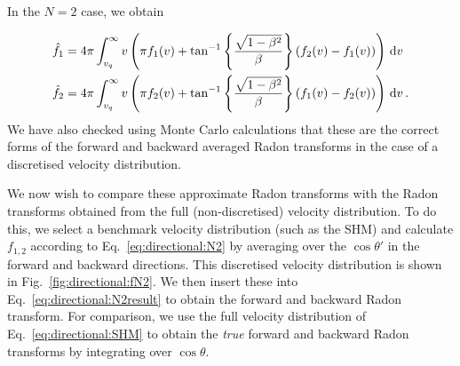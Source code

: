 
In the $N=2$ case, we obtain

\begin{align}
\label{eq:directional:N2result}
\hat{f}_1 &= 4\pi\int_{v_q}^{\infty} v \left( \pi f_1(v) + \tan^{-1}\left\{\frac{\sqrt{1-\beta^2}}{\beta}\right\}\left(f_2(v) - f_1(v)\right) \right) \, \mathrm{d}v \\
\hat{f}_2 &= 4\pi\int_{v_q}^{\infty} v \left( \pi f_2(v) + \tan^{-1}\left\{\frac{\sqrt{1-\beta^2}}{\beta}\right\}\left(f_1(v) - f_2(v)\right) \right) \, \mathrm{d}v\,.
\end{align}
We have also checked using Monte Carlo calculations that these are the correct forms of the forward and backward averaged Radon transforms in the case of a discretised velocity distribution.

We now wish to compare these approximate Radon transforms with the Radon transforms obtained from the full (non-discretised) velocity distribution. To do this, we select a benchmark velocity distribution (such as the SHM) and calculate $f_{1,2}$ according to Eq.~\ref{eq:directional:N2} by averaging over the $\cos\theta'$ in the forward and backward directions. This discretised velocity distribution is shown in Fig.~\ref{fig:directional:fN2}. We then insert these into Eq.~\ref{eq:directional:N2result} to obtain the forward and backward Radon transform. For comparison, we use the full velocity distribution of Eq.~\ref{eq:directional:SHM} to obtain the \textit{true} forward and backward Radon transforms by integrating over $\cos\theta$. 




